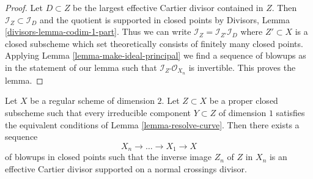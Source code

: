 \begin{proof}
Let $D \subset Z$ be the largest effective Cartier divisor contained in $Z$.
Then $\mathcal{I}_Z \subset \mathcal{I}_D$ and the quotient is supported
in closed points by Divisors, Lemma \ref{divisors-lemma-codim-1-part}.
Thus we can write $\mathcal{I}_Z = \mathcal{I}_{Z'} \mathcal{I}_D$
where $Z' \subset X$ is a closed subscheme which set theoretically
consists of finitely many closed points. Applying
Lemma \ref{lemma-make-ideal-principal}
we find a sequence of blowups as in the statement of our lemma
such that $\mathcal{I}_{Z'}\mathcal{O}_{X_n}$ is invertible.
This proves the lemma.
\end{proof}

\begin{lemma}
\label{lemma-embedded-resolution}
Let $X$ be a regular scheme of dimension $2$. Let $Z \subset X$
be a proper closed subscheme such that every irreducible component
$Y \subset Z$ of dimension $1$ satisfies the equivalent conditions of
Lemma \ref{lemma-resolve-curve}. Then there exists a sequence
$$
X_n \to \ldots \to X_1 \to X
$$
of blowups in closed points such that the inverse image $Z_n$ of $Z$
in $X_n$ is an effective Cartier divisor supported on a normal crossings
divisor.
\end{lemma}

